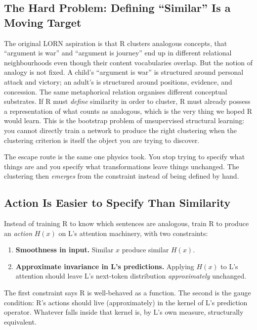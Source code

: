 \documentclass[11pt, a4paper]{article}
\theoremstyle{plain}
\theoremstyle{definition}
\theoremstyle{remark}
\begin{document}
\subsection{The Hard Problem: Defining ``Similar'' Is a Moving Target}

The original LORN aspiration is that R clusters analogous concepts, that ``argument is war'' and ``argument is journey'' end up in different relational neighbourhoods even though their content vocabularies overlap.
But the notion of analogy is not fixed.
A child's ``argument is war'' is structured around personal attack and victory; an adult's is structured around positions, evidence, and concession.
The same metaphorical relation organises different conceptual substrates.
If R must \emph{define} similarity in order to cluster, R must already possess a representation of what counts as analogous, which is the very thing we hoped R would learn.
This is the bootstrap problem of unsupervised structural learning: you cannot directly train a network to produce the right clustering when the clustering criterion is itself the object you are trying to discover.

The escape route is the same one physics took.
You stop trying to specify what things are and you specify what transformations leave things unchanged.
The clustering then \emph{emerges} from the constraint instead of being defined by hand.

\subsection{Action Is Easier to Specify Than Similarity}

Instead of training R to know which sentences are analogous, train R to produce an \emph{action} $H(x)$ on L's attention machinery, with two constraints:
\begin{enumerate}[nosep]
\item \textbf{Smoothness in input.} Similar $x$ produce similar $H(x)$.
\item \textbf{Approximate invariance in L's predictions.} Applying $H(x)$ to L's attention should leave L's next-token distribution \emph{approximately} unchanged.
\end{enumerate}
The first constraint says R is well-behaved as a function. The second is the gauge condition: R's actions should live (approximately) in the kernel of L's prediction operator. Whatever falls inside that kernel is, by L's own measure, structurally equivalent.
\end{document}
